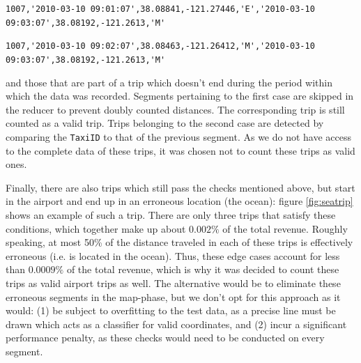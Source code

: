 \documentclass[11pt]{article}
\begin{document}
\hspace{-1.5cm}\verb|1007,'2010-03-10 09:01:07',38.08841,-121.27446,'E','2010-03-10 09:03:07',38.08192,-121.2613,'M'|

\hspace{-1.5cm}\verb|1007,'2010-03-10 09:02:07',38.08463,-121.26412,'M','2010-03-10 09:03:07',38.08192,-121.2613,'M'|

and those that are part of a trip which doesn't end during the period within which the data was recorded. Segments pertaining to the first case are skipped in the reducer to prevent doubly counted distances. The corresponding trip is still counted as a valid trip. Trips belonging to the second case are detected by comparing the \texttt{TaxiID} to that of the previous segment. As we do not have access to the complete data of these trips, it was chosen not to count these trips as valid ones.

Finally, there are also trips which still pass the checks mentioned above, but start in the airport and end up in an erroneous location (the ocean): figure \ref{fig:seatrip} shows an example of such a trip. There are only three trips that satisfy these conditions, which together
make up about $0.002\%$ of the total revenue. Roughly speaking, at most 50\% of the distance traveled in each of these trips is effectively erroneous (i.e. is located in the ocean). Thus, these edge cases account for less than $0.0009\%$ of the total revenue, which is why it was decided to count these trips as valid airport trips as well. The alternative would be to eliminate these erroneous segments in the map-phase, but we don't opt for this approach as it would:
(1) be subject to overfitting to the test data, as a precise line must be drawn which acts as a classifier for valid coordinates, and
(2) incur a significant performance penalty, as these checks would need to be conducted on every segment.
\end{document}
